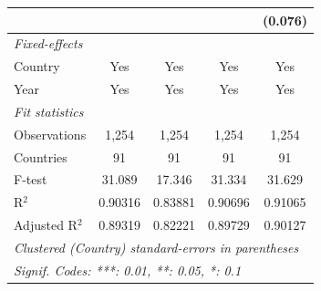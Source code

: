 \begin{table}[H]
\begin{tabular}{lcccc}
                                                                     &               &              &               & (0.076)\\   
      \midrule
      \emph{Fixed-effects}\\
      Country                                                        & Yes           & Yes          & Yes           & Yes\\  
      Year                                                           & Yes           & Yes          & Yes           & Yes\\  
      \midrule
      \emph{Fit statistics}\\
      Observations                                                   & 1,254         & 1,254        & 1,254         & 1,254\\  
      Countries                                                      & 91            & 91           & 91            & 91\\  
      F-test                                                         & 31.089        & 17.346       & 31.334        & 31.629\\  
      R$^2$                                                          & 0.90316       & 0.83881      & 0.90696       & 0.91065\\  
      Adjusted R$^2$                                                 & 0.89319       & 0.82221      & 0.89729       & 0.90127\\  
      \midrule \midrule
      \multicolumn{5}{l}{\emph{Clustered (Country) standard-errors in parentheses}}\\
      \multicolumn{5}{l}{\emph{Signif. Codes: ***: 0.01, **: 0.05, *: 0.1}}\\
   \end{tabular}
\end{table}


